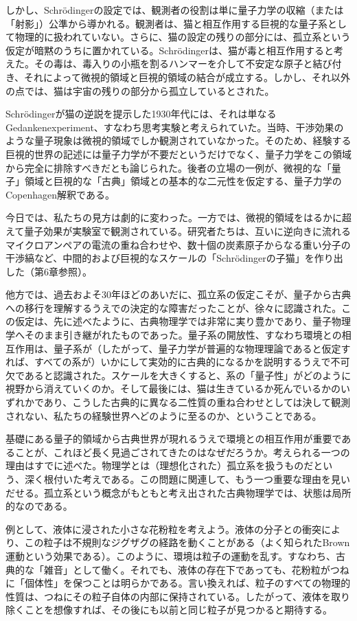 しかし、Schrödingerの設定では、観測者の役割は単に量子力学の収縮（または「射影」）公準から導かれる。観測者は、猫と相互作用する巨視的な量子系として物理的に扱われていない。さらに、猫の設定の残りの部分には、孤立系という仮定が暗黙のうちに置かれている。Schrödingerは、猫が毒と相互作用すると考えた。その毒は、毒入りの小瓶を割るハンマーを介して不安定な原子と結び付き、それによって微視的領域と巨視的領域の結合が成立する。しかし、それ以外の点では、猫は宇宙の残りの部分から孤立しているとされた。

Schrödingerが猫の逆説を提示した1930年代には、それは単なるGedankenexperiment、すなわち思考実験と考えられていた。当時、干渉効果のような量子現象は微視的領域でしか観測されていなかった。そのため、経験する巨視的世界の記述には量子力学が不要だというだけでなく、量子力学をこの領域から完全に排除すべきだとも論じられた。後者の立場の一例が、微視的な「量子」領域と巨視的な「古典」領域との基本的な二元性を仮定する、量子力学のCopenhagen解釈である。

今日では、私たちの見方は劇的に変わった。一方では、微視的領域をはるかに超えて量子効果が実験室で観測されている。研究者たちは、互いに逆向きに流れるマイクロアンペアの電流の重ね合わせや、数十個の炭素原子からなる重い分子の干渉縞など、中間的および巨視的なスケールの「Schrödingerの子猫」を作り出した（第6章参照）。

他方では、過去およそ30年ほどのあいだに、孤立系の仮定こそが、量子から古典への移行を理解するうえでの決定的な障害だったことが、徐々に認識された。この仮定は、先に述べたように、古典物理学では非常に実り豊かであり、量子物理学へそのまま引き継がれたものであった。量子系の開放性、すなわち環境との相互作用は、量子系が（したがって、量子力学が普遍的な物理理論であると仮定すれば、すべての系が）いかにして実効的に古典的になるかを説明するうえで不可欠であると認識された。スケールを大きくすると、系の「量子性」がどのように視野から消えていくのか。そして最後には、猫は生きているか死んでいるかのいずれかであり、こうした古典的に異なる二性質の重ね合わせとしては決して観測されない、私たちの経験世界へどのように至るのか、ということである。

\hypertarget{srcpage:4}{}\label{srcpage:4}基礎にある量子的領域から古典世界が現れるうえで環境との相互作用が重要であることが、これほど長く見過ごされてきたのはなぜだろうか。考えられる一つの理由はすでに述べた。物理学とは（理想化された）孤立系を扱うものだという、深く根付いた考えである。この問題に関連して、もう一つ重要な理由を見いだせる。孤立系という概念がもともと考え出された古典物理学では、状態は局所的なのである。

例として、液体に浸された小さな花粉粒を考えよう。液体の分子との衝突により、この粒子は不規則なジグザグの経路を動くことがある（よく知られたBrown運動という効果である）。このように、環境は粒子の運動を乱す。すなわち、古典的な「雑音」として働く。それでも、液体の存在下であっても、花粉粒がつねに「個体性」を保つことは明らかである。言い換えれば、粒子のすべての物理的性質は、つねにその粒子自体の内部に保持されている。したがって、液体を取り除くことを想像すれば、その後にも以前と同じ粒子が見つかると期待する。

